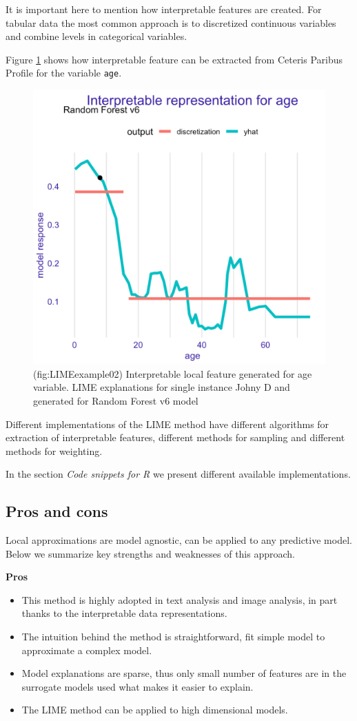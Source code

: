 \documentclass[12pt,]{krantz}
\providecommand{\tightlist}{%
  \setlength{\itemsep}{0pt}\setlength{\parskip}{0pt}}
\theoremstyle{definition}
\theoremstyle{definition}
\theoremstyle{definition}
\theoremstyle{remark}
\begin{document}
It is important here to mention how interpretable features are created.
For tabular data the most common approach is to discretized continuous
variables and combine levels in categorical variables.

Figure \ref{fig:LIMEexample02} shows how interpretable feature can be
extracted from Ceteris Paribus Profile for the variable \texttt{age}.

\begin{figure}

{\centering \includegraphics[width=0.6\linewidth]{figure/LIMEexample02} 

}

\caption{(fig:LIMEexample02) Interpretable local feature generated for age variable. LIME explanations for single instance Johny D and generated for Random Forest v6 model }\label{fig:LIMEexample02}
\end{figure}

Different implementations of the LIME method have different algorithms
for extraction of interpretable features, different methods for sampling
and different methods for weighting.

In the section \emph{Code snippets for R} we present different available
implementations.

\hypertarget{pros-and-cons-3}{%
\subsection{Pros and cons}\label{pros-and-cons-3}}

Local approximations are model agnostic, can be applied to any
predictive model. Below we summarize key strengths and weaknesses of
this approach.

\textbf{Pros}

\begin{itemize}
\tightlist
\item
  This method is highly adopted in text analysis and image analysis, in
  part thanks to the interpretable data representations.
\item
  The intuition behind the method is straightforward, fit simple model
  to approximate a complex model.
\item
  Model explanations are sparse, thus only small number of features are
  in the surrogate models used what makes it easier to explain.
\item
  The LIME method can be applied to high dimensional models.
\end{itemize}
\end{document}
